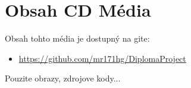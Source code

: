 
\chapter{Obsah CD Média} 

Obsah tohto média je dostupný na gite:
\begin{itemize}
	\item \url{https://github.com/mr171hg/DiplomaProject}
\end{itemize}

Pouzite obrazy, zdrojove kody...
